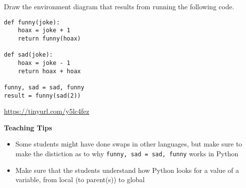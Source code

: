 \question Draw the environment diagram that results from running the following code.

\begin{lstlisting}
def funny(joke):
    hoax = joke + 1
    return funny(hoax)

def sad(joke):
    hoax = joke - 1
    return hoax + hoax

funny, sad = sad, funny
result = funny(sad(2))
\end{lstlisting}

\begin{solution}[2in]
\url{https://tinyurl.com/y5lc4fez}
\end{solution}

\begin{guide}
    \begin{blocksection}
    \textbf{Teaching Tips}
      \begin{itemize}
        \item Some students might have done swaps in other languages, but make sure to make the distiction as to why \lstinline{funny, sad = sad, funny} works in Python
        \item Make sure that the students understand how Python looks for a value of a variable, from local (to parent(s)) to global
      \end{itemize}
    \end{blocksection}
    \end{guide}
    